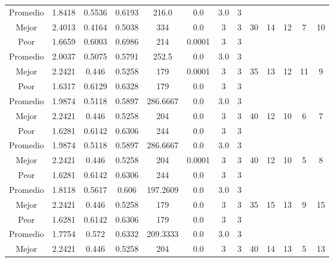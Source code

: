 \begin{table}[h!]
\begin{center}
\begin{tabular}{|c|c|c|c|c|c|c|c|c|c|c|c|c|}
        \hline
        \hline
            Promedio  & 1.8418 & 0.5536 & 0.6193 & 216.0 & 0.0 & 3.0 & 3 &  &  &  &  & \\
            \cline{1-8}
            Mejor & 2.4013 & 0.4164  & 0.5038 & 334 & 0.0 & 3 & 3 & 30 & 14 & 12 & 7 & 10\\
            \cline{1-8}
            Peor & 1.6659 & 0.6003  & 0.6986 & 214 & 0.0001 & 3 & 3 &  &  &  &  & \\
        \hline
        \hline
            Promedio  & 2.0037 & 0.5075 & 0.5791 & 252.5 & 0.0 & 3.0 & 3 &  &  &  &  & \\
            \cline{1-8}
            Mejor & 2.2421 & 0.446  & 0.5258 & 179 & 0.0001 & 3 & 3 & 35 & 13 & 12 & 11 & 9\\
            \cline{1-8}
            Peor & 1.6317 & 0.6129  & 0.6328 & 179 & 0.0 & 3 & 3 &  &  &  &  & \\
        \hline
        \hline
            Promedio  & 1.9874 & 0.5118 & 0.5897 & 286.6667 & 0.0 & 3.0 & 3 &  &  &  &  & \\
            \cline{1-8}
            Mejor & 2.2421 & 0.446  & 0.5258 & 204 & 0.0 & 3 & 3 & 40 & 12 & 10 & 6 & 7\\
            \cline{1-8}
            Peor & 1.6281 & 0.6142  & 0.6306 & 244 & 0.0 & 3 & 3 &  &  &  &  & \\
        \hline
        \hline
            Promedio  & 1.9874 & 0.5118 & 0.5897 & 286.6667 & 0.0 & 3.0 & 3 &  &  &  &  & \\
            \cline{1-8}
            Mejor & 2.2421 & 0.446  & 0.5258 & 204 & 0.0001 & 3 & 3 & 40 & 12 & 10 & 5 & 8\\
            \cline{1-8}
            Peor & 1.6281 & 0.6142  & 0.6306 & 244 & 0.0 & 3 & 3 &  &  &  &  & \\
        \hline
        \hline
            Promedio  & 1.8118 & 0.5617 & 0.606 & 197.2609 & 0.0 & 3.0 & 3 &  &  &  &  & \\
            \cline{1-8}
            Mejor & 2.2421 & 0.446  & 0.5258 & 179 & 0.0 & 3 & 3 & 35 & 15 & 13 & 9 & 15\\
            \cline{1-8}
            Peor & 1.6281 & 0.6142  & 0.6306 & 179 & 0.0 & 3 & 3 &  &  &  &  & \\
        \hline
        \hline
            Promedio  & 1.7754 & 0.572 & 0.6332 & 209.3333 & 0.0 & 3.0 & 3 &  &  &  &  & \\
            \cline{1-8}
            Mejor & 2.2421 & 0.446  & 0.5258 & 204 & 0.0 & 3 & 3 & 40 & 14 & 13 & 5 & 13\\

\end{tabular}
\end{center}
\end{table}
